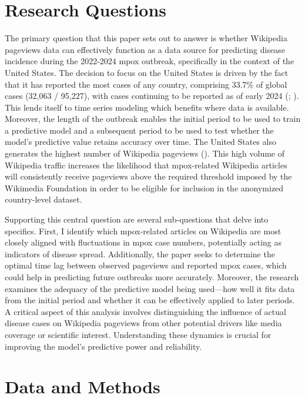 \documentclass[
  12pt,
]{article}
\begin{document}
\section{Research Questions}\label{research-questions}

The primary question that this paper sets out to answer is whether
Wikipedia pageviews data can effectively function as a data source for
predicting disease incidence during the 2022-2024 mpox outbreak,
specifically in the context of the United States. The decision to focus
on the United States is driven by the fact that it has reported the most
cases of any country, comprising 33.7\% of global cases (32,063 /
95,227), with cases continuing to be reported as of early 2024
(; ).
This lends itself to time series modeling which benefits where data is
available. Moreover, the length of the outbreak enables the initial
period to be used to train a predictive model and a subsequent period to
be used to test whether the model's predictive value retains accuracy
over time. The United States also generates the highest number of
Wikipedia pageviews (). This high volume of Wikipedia traffic increases the likelihood
that mpox-related Wikipedia articles will consistently receive pageviews
above the required threshold imposed by the Wikimedia Foundation in
order to be eligible for inclusion in the anonymized country-level
dataset.~

Supporting this central question are several sub-questions that delve
into specifics. First, I identify which mpox-related articles on
Wikipedia are most closely aligned with fluctuations in mpox case
numbers, potentially acting as indicators of disease spread.
Additionally, the paper seeks to determine the optimal time lag between
observed pageviews and reported mpox cases, which could help in
predicting future outbreaks more accurately. Moreover, the research
examines the adequacy of the predictive model being used---how well it
fits data from the initial period and whether it can be effectively
applied to later periods. A critical aspect of this analysis involves
distinguishing the influence of actual disease cases on Wikipedia
pageviews from other potential drivers like media coverage or scientific
interest. Understanding these dynamics is crucial for improving the
model's predictive power and reliability.

\section{Data and Methods}\label{data-and-methods}
\end{document}
